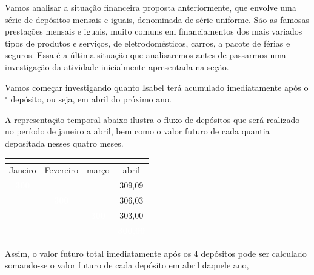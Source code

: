 
Vamos analisar a situação financeira proposta anteriormente, que envolve uma série de depósitos mensais e iguais, denominada de série uniforme. São as famosas prestações mensais e iguais, muito comuns em financiamentos dos mais variados tipos de produtos e serviços, de eletrodomésticos, carros, a pacote de férias e seguros. Essa é a última situação que analisaremos antes de passarmos uma investigação da atividade inicialmente apresentada na seção.

Vamos começar investigando quanto Isabel terá acumulado imediatamente após o $^{\circ}$ depósito, ou seja, em abril do próximo ano.

A representação temporal abaixo ilustra o fluxo de depósitos que será realizado no período de janeiro a abril, bem como o valor futuro de cada quantia depositada nesses quatro meses.

\begin{table}[H]
\centering
\begin{tabu} to \textwidth {|c|c|c|c|}
\hline
{}\\
\hline
Janeiro & Fevereiro & março & abril \\
\hline
{}\textcolor{white}{\textbf{300}} & & & 309,09 \\
\hline
& \textcolor{white}{\textbf{300}} & & 
 306,03 \\
\hline 
& & \textcolor{white}{\textbf{300}} & 
 303,00 \\
 \hline
& & & \textcolor{white}{\textbf{300,00}}\\
\hline

\end{tabu}
\end{table}



Assim, o valor futuro total imediatamente após os 4 depósitos pode ser calculado somando-se o valor futuro de cada depósito em abril daquele ano,

